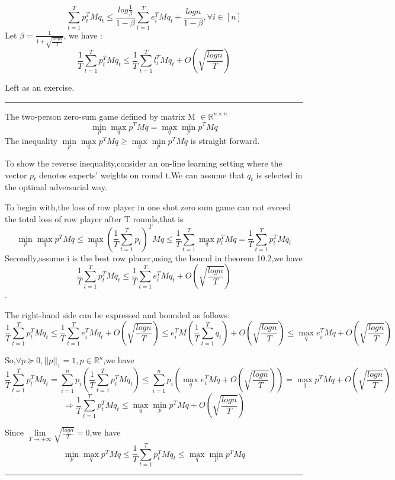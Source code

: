 \documentclass[twoside]{article}
\newenvironment{proof}{{\bf Proof:}}{\hfill\rule{2mm}{2mm}}
\begin{document}
$$\sum^T_{t=1}p^T_tMq_t \leqslant \frac{log \frac{1}{\beta}}{1-\beta}\sum^T_{t=1}e^T_iMq_t + \frac{logn}{1-\beta},\forall i \in [n] $$
	Let $\beta = \frac{1}{1+\sqrt{\frac{2logn}{T}}}$,
	we have :$$\frac{1}{T}\sum^T_{t=1}p^T_tMq_t \leqslant \frac{1}{T} \sum^T_{t=1}l^T_iMq_t + O(\sqrt{\frac{logn}{T}})  $$

\begin{proof}
Left as an exercise.
\end{proof}

	
The two-person zero-sum game defined by matrix M $\in \mathbb{R}^{n \times n}$
$$\min\limits_p\max\limits_q p^TMq=\max\limits_q\min\limits_p p^TMq$$ 
\begin{proof}
The inequality $\min\limits_p\max\limits_q p^TMq \ge \max\limits_q\min\limits_p p^TMq$ is straight forward.

To show the reverse inequality,consider an on-line learning setting where the vector $p_t$ denotes experts' weights on round t.We can assume that $q_t$ is selected in the optimal adversarial way.

To begin with,the loss of row player in one shot zero sum game can not exceed the total loss of row player after T rounds,that is $$\min\limits_p\max\limits_q p^TMq \le \max\limits_q(\frac{1}{T}\sum\limits_{t=1}^{T}p_t)^TMq \le \frac{1}{T}\sum\limits_{t=1}^{T}\max\limits_qp_t^TMq=\frac{1}{T}\sum\limits_{t=1}^{T}p_t^TMq_t$$Secondly,assume i is the best row plauer,using the bound in theorem 10.2,we have $$\frac{1}{T}\sum\limits_{t=1}^{T}p_t^TMq_t \le \frac{1}{T}\sum\limits_{t=1}^{T}e_i^TMq_t+O(\sqrt{\frac{logn}{T}})$$.

The right-hand side can be expressed and bounded as follows:
$$\frac{1}{T}\sum\limits_{t=1}^{T}p_t^TMq_t \le \frac{1}{T}\sum\limits_{t=1}^{T}e_i^TMq_t+O(\sqrt{\frac{logn}{T}}) \le e_i^TM(\frac{1}{T}\sum\limits_{t=1}^{T}q_t)+O(\sqrt{\frac{logn}{T}}) \le \max\limits_q e_i^TMq +O(\sqrt{\frac{logn}{T}})$$

So,$\forall p \succeq 0,||p||_1=1,p \in \mathbb{R}^n$,we have
$$\frac{1}{T}\sum\limits_{t=1}^{T}p_t^TMq_t=\sum\limits_{i=1}^n p_i(\frac{1}{T}\sum\limits_{t=1}^{T}p_t^TMq_t) \le \sum\limits_{i=1}^n p_i(\max\limits_q e_i^TMq+O(\sqrt{\frac{logn}{T}}))=\max\limits_q p^TMq+O(\sqrt{\frac{logn}{T}})$$
$$\Rightarrow \frac{1}{T}\sum\limits_{t=1}^{T}p_t^TMq_t \le \max\limits_q\min\limits_p p^TMq+O(\sqrt{\frac{logn}{T}})$$

Since $\lim\limits_{T \to +\infty}\sqrt{\frac{logn}{T}} =0$,we have
$$\min\limits_p\max\limits_q p^TMq \le \frac{1}{T}\sum\limits_{t=1}^{T}p_t^TMq_t \le \max\limits_q\min\limits_p p^TMq$$
\end{proof}
\end{document}
